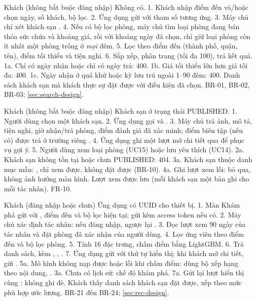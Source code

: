 {Khách (không bắt buộc đăng nhập)}
{Không có.}
{1. Khách nhập điểm đến và/hoặc chọn ngày, số khách, bộ lọc. 2. Ứng dụng gửi  với tham số tương ứng. 3. Máy chủ chỉ xét khách sạn . 4. Nếu có bộ lọc phòng, máy chủ tìm loại phòng đang bán thỏa sức chứa và khoảng giá, rồi với khoảng ngày đã chọn, chỉ giữ loại phòng còn ít nhất một phòng trống ở \emph{mọi} đêm. 5. Lọc theo điểm đến (thành phố, quận, tên), điểm tối thiểu và tiện nghi. 6. Sắp xếp, phân trang (tối đa 100), trả kết quả.}
{1a. Chỉ có ngày nhận hoặc chỉ có ngày trả: 400. 1b. Giá tối thiểu lớn hơn giá tối đa: 400. 1c. Ngày nhận ở quá khứ hoặc kỳ lưu trú ngoài 1--90 đêm: 400.}
{Danh sách khách sạn mà khách thực sự đặt được với điều kiện đã chọn.}
{BR-01, BR-02, BR-03; \cref{sec:search-design}.}

{Khách (không bắt buộc đăng nhập)}
{Khách sạn ở trạng thái PUBLISHED.}
{1. Người dùng chọn một khách sạn. 2. Ứng dụng gọi  và . 3. Máy chủ trả ảnh, mô tả, tiện nghi, giờ nhận/trả phòng, điểm đánh giá đã xác minh; điểm biên tập (nếu có) được trả ở trường riêng . 4. Ứng dụng ghi một lượt mở chi tiết qua  để phục vụ gợi ý. 5. Người dùng xem loại phòng (UC15) hoặc lưu yêu thích (UC14).}
{2a. Khách sạn không tồn tại hoặc chưa PUBLISHED: 404. 3a. Khách sạn thuộc danh mục mẫu: , chỉ xem được, không đặt được (BR-10). 4a. Ghi lượt xem lỗi: bỏ qua, không ảnh hưởng màn hình.}
{Lượt xem được lưu (mỗi khách sạn một bản ghi cho mỗi tác nhân).}
{FR-10.}

{Khách (đăng nhập hoặc chưa)}
{Ứng dụng có  UUID cho thiết bị.}
{1. Màn Khám phá gửi  với , điểm đến và bộ lọc hiện tại; gửi kèm access token nếu có. 2. Máy chủ xác định tác nhân:  nếu đăng nhập, ngược lại . 3. Đọc lượt xem 90 ngày của tác nhân và đặt phòng đã xác nhận của người dùng. 4. Lọc ứng viên theo điểm đến và bộ lọc phòng. 5. Tính 16 đặc trưng, chấm điểm bằng LightGBM. 6. Trả danh sách, kèm , , . 7. Ứng dụng gửi  với thứ tự hiển thị; khi khách mở chi tiết, gửi .}
{5a. Mô hình không nạp được hoặc lỗi khi chấm điểm: dùng bộ xếp hạng theo nội dung, . 3a. Chưa có lịch sử: chế độ khám phá. 7a. Gửi lại lượt hiển thị cùng : không ghi đè.}
{Khách thấy danh sách khách sạn đặt được, xếp theo mức phù hợp ước lượng.}
{BR-21 đến BR-24; \cref{sec:rec-design}.}

